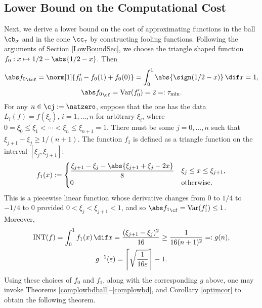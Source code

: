 \subsection{Lower Bound on the Computational Cost}
Next, we derive a lower bound on the cost of approximating functions in the ball $\cb_{\sigma}$ and in the cone $\cc_{\tau}$ by constructing fooling functions. Following the arguments of Section \ref{LowBoundSec}, we choose  the triangle shaped function $f_0: x \mapsto 1/2-\abs{1/2-x}$. Then
\begin{gather*}
\Ftnorm{f_0}=\norm[1]{f'_0-f_0(1)+f_0(0)}=\int_0^1 \abs{\sign(1/2-x)} \, \dif x = 1, \\ \Fnorm{f_0}=\Var(f'_0)=2=: \tau_{\min}.
\end{gather*}
For any $n \in \cj:=\natzero$, suppose that the one has the data $L_i(f)=f(\xi_i)$, $i=1, \ldots, n$ for arbitrary $\xi_i$, where $0=\xi_0 \le \xi_1 < \cdots < \xi_n \le \xi_{n+1} = 1$.  There must be some $j=0, \ldots, n$ such that $\xi_{j+1} - \xi_j \ge 1/(n+1)$.  The function $f_{1}$ is defined as a triangle function on the interval $[\xi_j, \xi_{j+1}]$:
$$
f_{1}(x):=\begin{cases} \displaystyle
\frac{\xi_{j+1}-\xi_{j}-\abs{\xi_{j+1}+\xi_{j}-2x}}{8} & \xi_{j} \le x \leq \xi_{j+1},\\
0 & \text{otherwise}.
\end{cases}
$$
This is a piecewise linear function whose derivative changes from $0$ to $1/4$ to $-1/4$ to $0$ provided $0 < \xi_j < \xi_{j+1} < 1$, and so $\Fnorm{f_1}=\Var(f'_1)\le 1$. Moreover,
\begin{gather*}
\INT(f)=\int_0^1 f_1(x) \, \dif x = \frac{(\xi_{j+1} - \xi_j)^2}{16} \ge \frac{1}{16(n+1)^2} =: g(n),\\
g^{-1}(\varepsilon)=\left \lceil \sqrt{\frac{1}{16 \varepsilon}} \right \rceil - 1.
\end{gather*}
Using these choices of $f_0$ and $f_1$, along with the corresponding $g$ above, one may invoke Theorems \ref{complowbdball}--\ref{complowbd}, and Corollary \ref{optimcor} to obtain the following theorem.

